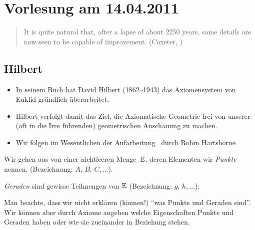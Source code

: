 \section*{Vorlesung am 14.04.2011}

\begin{quote}
    It is quite natural that, after a lapse of about 2250 years, some details are now seen to be
    capable of improvement. (Coxeter, \cite[Section 1.2]{coxeter-1969})
\end{quote}

\subsection*{Hilbert}

\begin{itemize}
    \item In seinem Buch \cite{hilbert} hat David Hilbert (1862--1943) das Axiomensystem von Euklid
        gründlich überarbeitet.

    \item Hilbert verfolgt damit das Ziel, die Axiomatische Geometrie frei von unserer (oft in die
        Irre führenden) geometrischen Anschauung zu machen.

    \item Wir folgen im Wesentlichen der Aufarbeitung~\cite{hartshorne-2000} durch Robin Hartshorne
\end{itemize}



Wir gehen aus von einer nichtleeren Menge~$\mathbb E$, deren Elementen wir {\em Punkte} nennen.
(Bezeichnung: $A,\,B,\,C,\ldots$).

{\em Geraden} sind gewisse Teilmengen von $\mathbb E$ (Bezeichnung: $g,\,h,\ldots$);

Man beachte, dass wir nicht erklären (können!) "`was Punkte und Geraden sind"'. Wir können aber
durch Axiome angeben welche Eigenschaften Punkte und Geraden haben oder wie sie zueinander in
Beziehung stehen.

